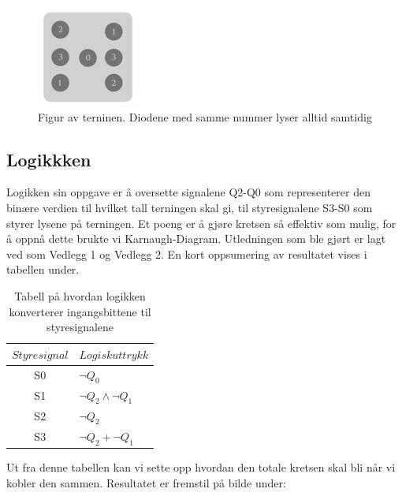 \documentclass[12pt,norsk,a4paper]{article}
\begin{document}
    \begin{figure}[H]
    \begin{center}
    \includegraphics[scale=1]{Terning.png}
    \caption{Figur av terninen. Diodene med samme nummer lyser alltid samtidig}
    \label{fig:terning}
    \end{center}
    \end{figure}

    \subsection{Logikkken}
    Logikken sin oppgave er å oversette signalene Q2-Q0 som representerer den binære verdien til hvilket tall terningen skal gi, til styresignalene S3-S0 som styrer lysene på terningen. Et poeng er å gjøre kretsen så effektiv som mulig, for å oppnå dette brukte vi Karnaugh-Diagram. Utledningen som ble gjørt er lagt ved som Vedlegg 1 og Vedlegg 2. En kort oppsumering av resultatet vises i tabellen under.

    \begin{table}[H] 
    \begin{center}
        \begin{tabular}{ | c | l |} 
        \hline
        $Styresignal$  & $Logisk uttrykk$ \\ \hline 
        S0 & $\neg Q_0$\\ \hline
        S1 & $\neg Q_2 \wedge \neg Q_1$\\ \hline
        S2 & $\neg Q_2$\\ \hline
        S3 & $\neg Q_2 + \neg Q_1$\\ \hline
        \hline
        \end{tabular}
        \end{center}
        \caption{Tabell på hvordan logikken konverterer ingangsbittene til styresignalene}

\end{table}

    Ut fra denne tabellen kan vi sette opp hvordan den totale kretsen skal bli når vi kobler den sammen. Resultatet er fremstil på bilde under: 
\end{document}
